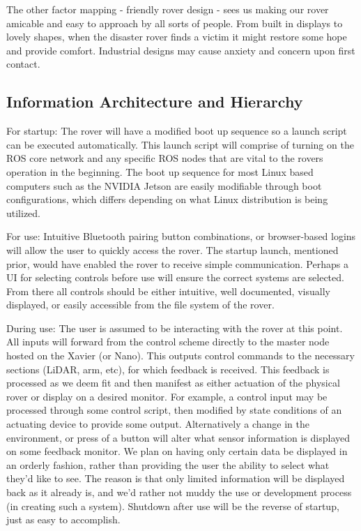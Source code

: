 \documentclass[a4paper, 10pt]{article}
\begin{document}
	The other factor mapping - friendly rover design - sees us making our rover amicable and easy to approach by all sorts of people. From built in displays to lovely shapes, when the disaster rover finds a victim it might restore some hope and provide comfort. Industrial designs may cause anxiety and concern upon first contact.
	
	\subsection{Information Architecture and Hierarchy}	
	For startup: The rover will have a modified boot up sequence so a launch script can be executed automatically. This launch script will comprise of turning on the ROS core network and any specific ROS nodes that are vital to the rovers operation in the beginning. The boot up sequence for most Linux based computers such as the NVIDIA Jetson are easily modifiable through boot configurations, which differs depending on what Linux distribution is being utilized.

	For use: Intuitive Bluetooth pairing button combinations, or browser-based logins will allow the user to quickly access the rover. The startup launch, mentioned prior, would have enabled the rover to receive simple communication. Perhaps a UI for selecting controls before use will ensure the correct systems are selected. From there all controls should be either intuitive, well documented, visually displayed, or easily accessible from the file system of the rover. 

	During use: The user is assumed to be interacting with the rover at this point. All inputs will forward from the control scheme directly to the master node hosted on the Xavier (or Nano). This outputs control commands to the necessary sections (LiDAR, arm, etc), for which feedback is received. This feedback is processed as we deem fit and then manifest as either actuation of the physical rover or display on a desired monitor. For example, a control input may be processed through some control script, then modified by state conditions of an actuating device to provide some output. Alternatively a change in the environment, or press of a button will alter what sensor information is displayed on some feedback monitor. We plan on having only certain data be displayed in an orderly fashion, rather than providing the user the ability to select what they'd like to see. The reason is that only limited information will be displayed back as it already is, and we'd rather not muddy the use or development process (in creating such a system). Shutdown after use will be the reverse of startup, just as easy to accomplish.
\end{document}
